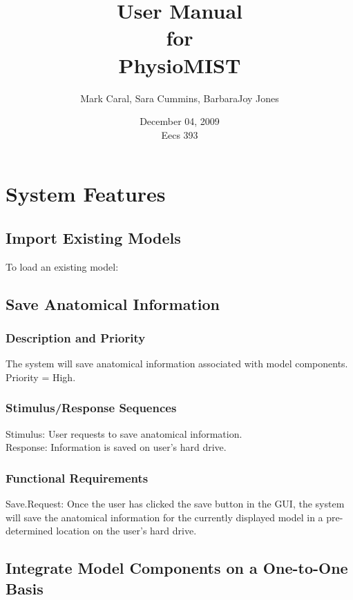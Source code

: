 \documentclass{article}
\title{User Manual\\
\bigskip
{\large for}\\
\bigskip
PhysioMIST}
\author{Mark Caral, Sara Cummins, BarbaraJoy Jones}
\date{December 04, 2009\\{\sc Eecs} 393}
\begin{document}
\begin{titlepage}
\maketitle\thispagestyle{empty}
\end{titlepage}

\tableofcontents
\newpage


\section{System Features}

\subsection{Import Existing Models}

To load an existing model: \\

\subsection{Save Anatomical Information}
\subsubsection{Description and Priority}
The system will save anatomical information associated with model components.\\
Priority = High.

\subsubsection{Stimulus/Response Sequences}
Stimulus: User requests to save anatomical information.\\
Response: Information is saved on user's hard drive.

\subsubsection{Functional Requirements}
Save.Request: Once the user has clicked the save button in the GUI, the system will save the anatomical information for the currently displayed model in a pre-determined location on the user's hard drive.

\subsection{Integrate Model Components on a One-to-One Basis}
\end{document}
